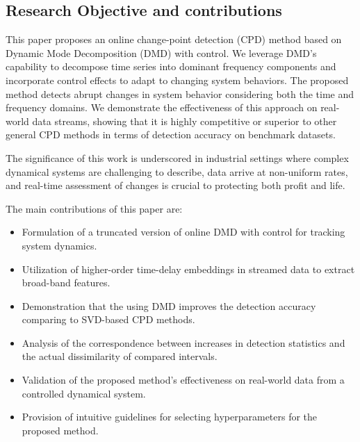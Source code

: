 \subsection{Research Objective and contributions}
This paper proposes an online change-point detection (CPD) method based on Dynamic Mode Decomposition (DMD) with control. We leverage DMD's capability to decompose time series into dominant frequency components and incorporate control effects to adapt to changing system behaviors. The proposed method detects abrupt changes in system behavior considering both the time and frequency domains. We demonstrate the effectiveness of this approach on real-world data streams, showing that it is highly competitive or superior to other general CPD methods in terms of detection accuracy on benchmark datasets.

The significance of this work is underscored in industrial settings where complex dynamical systems are challenging to describe, data arrive at non-uniform rates, and real-time assessment of changes is crucial to protecting both profit and life.

The main contributions of this paper are:
\begin{itemize}
    \item Formulation of a truncated version of online DMD with control for tracking system dynamics.
    \item Utilization of higher-order time-delay embeddings in streamed data to extract broad-band features.
    \item Demonstration that the using DMD improves the detection accuracy comparing to SVD-based CPD methods.
    \item Analysis of the correspondence between increases in detection statistics and the actual dissimilarity of compared intervals.
    \item Validation of the proposed method's effectiveness on real-world data from a controlled dynamical system.
    \item Provision of intuitive guidelines for selecting hyperparameters for the proposed method.
\end{itemize}
